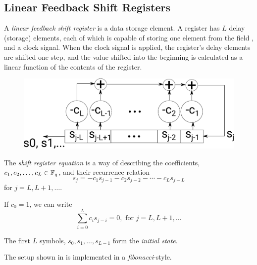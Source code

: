 \subsection{Linear Feedback Shift Registers}\label{subsec:LFSRs}
\begin{definition}\label{def:LFSR}
  A \emph{linear feedback shift register} is a data storage element.
  A register has $L$ delay (storage) elements, each of which is capable of storing one element from the field , and a clock signal.
  When the clock signal is applied, the register's delay elements are shifted one step, and the value shifted into the beginning is calculated as a linear function of the contents of the register.

  \begin{figure}[h!]
    \centering
    \includegraphics[scale=0.50]{./Drawings/EDIN01-Cryptography/Linear_Feedback_Shift_Register.png}
    \caption{}
    \label{fig:LSFR}
  \end{figure}
\end{definition}

\begin{definition}\label{def:Shift_Register_Equation}
  The \emph{shift register equation} is a way of describing the coefficients, $c_{1}, c_{2}, \ldots, c_{L} \in \mathbb{F}_{q^{}}$, and their recurrence relation
  \begin{equation}\label{eq:Shift_Register_Equation}
    s_{j} = -c_{1}s_{j-1} - c_{2}s_{j-2} - \cdots - c_{L}s_{j-L}
  \end{equation}
  for $j = L, L+1, \ldots$.

  If  $c_{0} = 1$, we can write
  \begin{equation}\label{eq:Shift_Register_Equation-Summation}
    \sum\limits_{i=0}^{L} c_{i}s_{j-i} = 0, \text{ for } j = L, L+1, \ldots
  \end{equation}

  \begin{remark}\label{rmk:Shift_Register_Initial_State-Fibonacci}
    The first $L$ symbols, $s_{0}, s_{1}, \ldots, s_{L-1}$ form the \emph{initial state}.
  \end{remark}

  \begin{remark}\label{rmk:Shift_Register-Fibonacci}
    The  setup shown in  is implemented in a \emph{fibonacci}-style.
  \end{remark}
\end{definition}

